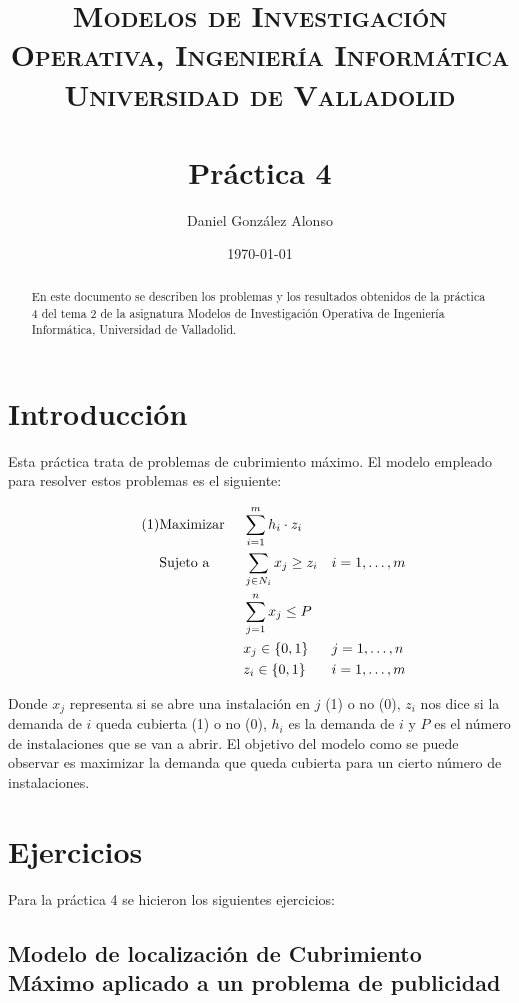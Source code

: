 \documentclass[a4paper,11pt]{article}
\title{
	\vspace{-25pt}
	\normalfont \Large \textsc{
		Modelos de Investigación Operativa,
        Ingeniería Informática\\
        Universidad de Valladolid
	}\\[10pt]
	\horrule{1pt}\\[10pt]
	\huge \textbf{
		Práctica 4
	}\\
	\horrule{1pt}
}
\author{
	\normalfont \Large Daniel González Alonso
}
\date{
	\normalfont \large \today
}
\newcommand\numberthis{				%
	\addtocounter{equation}{1}\tag{\theequation}
}
\begin{document}
\maketitle

\begin{abstract}
En este documento se describen los problemas y los resultados obtenidos de la práctica 4 del tema 2 de la asignatura Modelos de Investigación Operativa de Ingeniería Informática, Universidad de Valladolid.
\end{abstract}

\section{Introducción}

Esta práctica trata de problemas de cubrimiento máximo. El modelo empleado para resolver estos problemas es el siguiente:

\begin{align*}\numberthis
   	&\textrm{Maximizar }	&& \sum_{i=1}^{m}{h_i \cdot z_i}		&&				\\
   	&\textrm{Sujeto a }		&& \sum_{j \in N_{i}}{x_j} \geq z_i 	&& i=1,\ldots,m \\
    &						&& \sum_{j=1}^{n}{x_j} \leq P			&&				\\
	&						&& x_{j} \in \{0,1\}					&& j=1,\ldots,n \\
	&						&& z_{i} \in \{0,1\}					&& i=1,\ldots,m \\
\end{align*}

Donde ${x_j}$ representa si se abre una instalación en ${j}$ (1) o no (0), ${z_i}$ nos dice si la demanda de ${i}$ queda cubierta (1) o no (0), ${h_i}$ es la demanda de ${i}$ y ${P}$ es el número de instalaciones que se van a abrir. El objetivo del modelo como se puede observar es maximizar la demanda que queda cubierta para un cierto número de instalaciones.

\newpage
\section{Ejercicios}

Para la práctica 4 se hicieron los siguientes ejercicios:

\subsection{Modelo de localización de Cubrimiento Máximo aplicado a un problema de publicidad}
\end{document}
